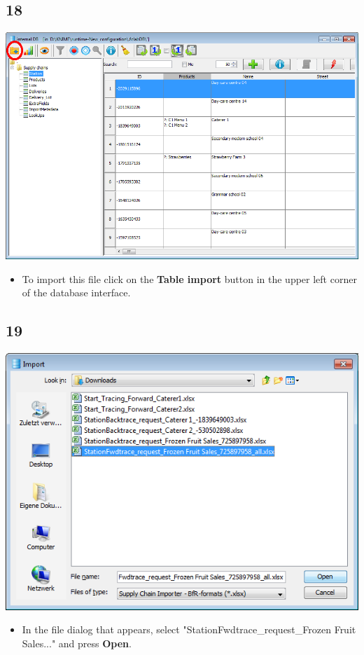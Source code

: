 \documentclass{beamer}
\begin{document}
\subsection{18}
\begin{frame}
	\begin{center}
  		\includegraphics[height=0.6\textheight]{18.png}
	\end{center}
	\begin{itemize}
		\item To import this file click on the \textbf{Table import} button in the upper left corner of the database interface.
	\end{itemize}
\end{frame}

\subsection{19}
\begin{frame}
	\begin{center}
  		\includegraphics[height=0.5\textheight]{19.png}
	\end{center}
	\begin{itemize}
		\item In the file dialog that appears, select "StationFwdtrace\_request\_Frozen Fruit Sales..." and press \textbf{Open}.	
	\end{itemize}
\end{frame}
\end{document}
